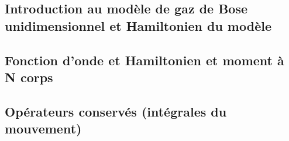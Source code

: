 \subsection{Introduction au modèle de gaz de Bose unidimensionnel et Hamiltonien du modèle}
%




%



%


%
 
\subsection{Fonction d’onde et Hamiltonien et moment à N corps}
%


\subsection{Opérateurs conservés (intégrales du mouvement)}
%








%



%

